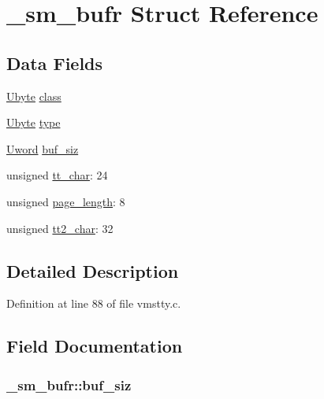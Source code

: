 \hypertarget{struct__sm__bufr}{\section{\+\_\+sm\+\_\+bufr Struct Reference}
\label{struct__sm__bufr}
}
\subsection*{Data Fields}
\begin{DoxyCompactItemize}
\item 
\hyperlink{vmstty_8c_ad63f4b09652b16512a7f3f814177ff65}{Ubyte} \hyperlink{struct__sm__bufr_a433693b2c5d96b64616f656cebff4868}{class}
\item 
\hyperlink{vmstty_8c_ad63f4b09652b16512a7f3f814177ff65}{Ubyte} \hyperlink{struct__sm__bufr_a054e961db058544721dfd84fcd024107}{type}
\item 
\hyperlink{vmstty_8c_a6124fd8a90b8b651aacc9d98026ad4e4}{Uword} \hyperlink{struct__sm__bufr_afbfa0e00366f8d34e78d42ea457d2f4d}{buf\+\_\+siz}
\item 
unsigned \hyperlink{struct__sm__bufr_a95c7d0fca83d31354940d6ef4b619f3e}{tt\+\_\+char}\+: 24
\item 
unsigned \hyperlink{struct__sm__bufr_a157e75c6193687f1d228d156dee71091}{page\+\_\+length}\+: 8
\item 
unsigned \hyperlink{struct__sm__bufr_a1647749f7ee214aab54959067adfbd1b}{tt2\+\_\+char}\+: 32
\end{DoxyCompactItemize}


\subsection{Detailed Description}


Definition at line 88 of file vmstty.\+c.



\subsection{Field Documentation}
\hypertarget{struct__sm__bufr_afbfa0e00366f8d34e78d42ea457d2f4d}{
\subsubsection[{buf\+\_\+siz}]{ \+\_\+sm\+\_\+bufr\+::buf\+\_\+siz}}\label{struct__sm__bufr_afbfa0e00366f8d34e78d42ea457d2f4d}


